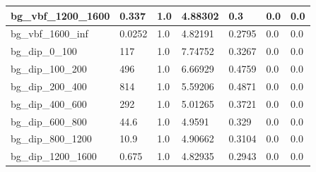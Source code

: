 \documentclass[a4paper, 10pt]{article}
\begin{document}
\begin{table}[H]
\begin{center}
\begin{tabular}{|m{23.0mm}|m{23.0mm}|m{18.0mm}|m{19.0mm}|m{19.0mm}|m{19.0mm}|m{19.0mm}|}
      \hline
      {\cellcolor{white}         bg\_vbf\_1200\_1600}& {\cellcolor{white}         0.337}& {\cellcolor{white}         1.0}& {\cellcolor{white}         4.88302}& {\cellcolor{white}         0.3}& {\cellcolor{green}         0.0}& {\cellcolor{green}         0.0}\\
      \hline
      {\cellcolor{white}         bg\_vbf\_1600\_inf}& {\cellcolor{white}         0.0252}& {\cellcolor{white}         1.0}& {\cellcolor{white}         4.82191}& {\cellcolor{white}         0.2795}& {\cellcolor{green}         0.0}& {\cellcolor{green}         0.0}\\
      \hline
      {\cellcolor{white}         bg\_dip\_0\_100}& {\cellcolor{white}         117}& {\cellcolor{white}         1.0}& {\cellcolor{white}         7.74752}& {\cellcolor{white}         0.3267}& {\cellcolor{green}         0.0}& {\cellcolor{green}         0.0}\\
      \hline
      {\cellcolor{white}         bg\_dip\_100\_200}& {\cellcolor{white}         496}& {\cellcolor{white}         1.0}& {\cellcolor{white}         6.66929}& {\cellcolor{white}         0.4759}& {\cellcolor{green}         0.0}& {\cellcolor{green}         0.0}\\
      \hline
      {\cellcolor{white}         bg\_dip\_200\_400}& {\cellcolor{white}         814}& {\cellcolor{white}         1.0}& {\cellcolor{white}         5.59206}& {\cellcolor{white}         0.4871}& {\cellcolor{green}         0.0}& {\cellcolor{green}         0.0}\\
      \hline
      {\cellcolor{white}         bg\_dip\_400\_600}& {\cellcolor{white}         292}& {\cellcolor{white}         1.0}& {\cellcolor{white}         5.01265}& {\cellcolor{white}         0.3721}& {\cellcolor{green}         0.0}& {\cellcolor{green}         0.0}\\
      \hline
      {\cellcolor{white}         bg\_dip\_600\_800}& {\cellcolor{white}         44.6}& {\cellcolor{white}         1.0}& {\cellcolor{white}         4.9591}& {\cellcolor{white}         0.329}& {\cellcolor{green}         0.0}& {\cellcolor{green}         0.0}\\
      \hline
      {\cellcolor{white}         bg\_dip\_800\_1200}& {\cellcolor{white}         10.9}& {\cellcolor{white}         1.0}& {\cellcolor{white}         4.90662}& {\cellcolor{white}         0.3104}& {\cellcolor{green}         0.0}& {\cellcolor{green}         0.0}\\
      \hline
      {\cellcolor{white}         bg\_dip\_1200\_1600}& {\cellcolor{white}         0.675}& {\cellcolor{white}         1.0}& {\cellcolor{white}         4.82935}& {\cellcolor{white}         0.2943}& {\cellcolor{green}         0.0}& {\cellcolor{green}         0.0}\\

\end{tabular}
\end{center}
\end{table}
\end{document}
